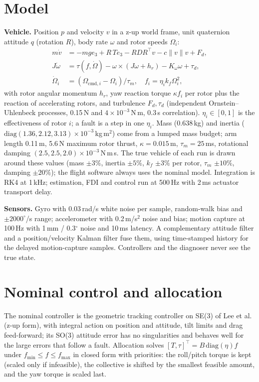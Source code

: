 \documentclass[conference]{IEEEtran}
\begin{document}
\section{Model}
\textbf{Vehicle.} Position $p$ and velocity $v$ in a z-up world frame, unit quaternion attitude
$q$ (rotation $R$), body rate $\omega$ and rotor speeds $\Omega_i$:
\begin{align}
m\dot v &= -mg e_3 + R\,T e_3 - R D R^\top v - c\|v\|v + F_d,\\
J\dot\omega &= \tau(f,\dot\Omega) - \omega\times(J\omega + h_r) - K_\omega\omega + \tau_d,\\
\dot\Omega_i &= (\Omega_{\mathrm{cmd},i}-\Omega_i)/\tau_m,\quad f_i = \eta_i k_f \Omega_i^2,
\end{align}
with rotor angular momentum $h_r$, yaw reaction torque $\kappa f_i$ per rotor plus the reaction
of accelerating rotors, and turbulence $F_d,\tau_d$ (independent Ornstein--Uhlenbeck processes,
0.15\,N and $4\times10^{-3}$\,N\,m, 0.3\,s correlation). $\eta_i\in[0,1]$ is the effectiveness of
rotor $i$; a fault is a step in one $\eta_i$. Mass (0.638\,kg) and inertia
($\mathrm{diag}(1.36,2.12,3.13)\times10^{-3}$\,kg\,m$^2$) come from a lumped mass budget; arm length
0.11\,m, 5.6\,N maximum rotor thrust, $\kappa=0.015$\,m, $\tau_m=25$\,ms, rotational damping
$(2.5,2.5,2.0)\times10^{-3}$\,N\,m\,s. The true vehicle of each run is drawn around these values
(mass $\pm3\%$, inertia $\pm5\%$, $k_f$ $\pm3\%$ per rotor, $\tau_m$ $\pm10\%$, damping $\pm20\%$); the
flight software always uses the nominal model. Integration is RK4 at 1\,kHz; estimation, FDI
and control run at 500\,Hz with 2\,ms actuator transport delay.

\textbf{Sensors.} Gyro with 0.03\,rad/s white noise per sample, random-walk bias and
$\pm2000^\circ$/s range; accelerometer with 0.2\,m/s$^2$ noise and bias; motion capture at
100\,Hz with 1\,mm / 0.3$^\circ$ noise and 10\,ms latency. A complementary attitude filter and a
position/velocity Kalman filter fuse them, using time-stamped history for the delayed
motion-capture samples. Controllers and the diagnoser never see the true state.

\section{Nominal control and allocation}
The nominal controller is the geometric tracking controller on SE(3) of Lee et
al.~\cite{lee2010geometric} (z-up form), with integral action on position and attitude, tilt
limits and drag feed-forward; its SO(3) attitude error has no singularities and behaves well
for the large errors that follow a fault. Allocation solves $[T,\tau]^\top = B\,\mathrm{diag}(\eta)
f$ under $f_{\min}\le f\le f_{\max}$ in closed form with priorities: the roll/pitch torque is kept
(scaled only if infeasible), the collective is shifted by the smallest feasible amount, and the
yaw torque is scaled last.
\end{document}
